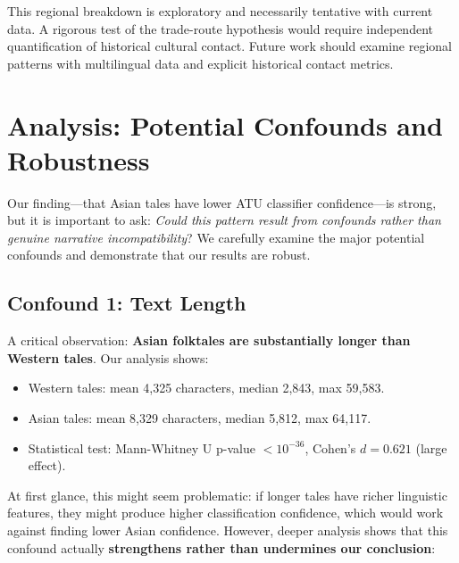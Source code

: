 \documentclass{article}
\begin{document}
This regional breakdown is exploratory and necessarily tentative with current data. A rigorous test of the trade-route hypothesis would require independent quantification of historical cultural contact. Future work should examine regional patterns with multilingual data and explicit historical contact metrics.

\section{Analysis: Potential Confounds and Robustness}

Our finding---that Asian tales have lower ATU classifier confidence---is strong, but it is important to ask: \textit{Could this pattern result from confounds rather than genuine narrative incompatibility}? We carefully examine the major potential confounds and demonstrate that our results are robust.

\subsection{Confound 1: Text Length}

A critical observation: \textbf{Asian folktales are substantially longer than Western tales}. Our analysis shows:

\begin{itemize}
\item Western tales: mean 4,325 characters, median 2,843, max 59,583.
\item Asian tales: mean 8,329 characters, median 5,812, max 64,117.
\item Statistical test: Mann-Whitney U p-value $< 10^{-36}$, Cohen's $d = 0.621$ (large effect).
\end{itemize}

At first glance, this might seem problematic: if longer tales have richer linguistic features, they might produce higher classification confidence, which would work against finding lower Asian confidence. However, deeper analysis shows that this confound actually \textbf{strengthens rather than undermines our conclusion}:
\end{document}
